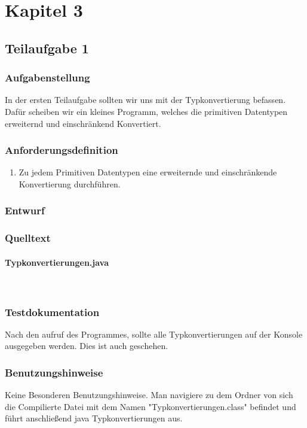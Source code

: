 \section{Kapitel 3}
\subsection{Teilaufgabe 1}
\subsubsection{Aufgabenstellung}
In der ersten Teilaufgabe sollten wir uns mit der Typkonvertierung befassen. Dafür scheiben wir
ein kleines Programm, welches die primitiven Datentypen erweiternd und einschränkend
Konvertiert.

\subsubsection{Anforderungsdefinition}
\begin{enumerate}
	\item Zu jedem Primitiven Datentypen eine erweiternde und einschränkende Konvertierung
	durchführen.
\end{enumerate}

\subsubsection{Entwurf}


\subsubsection{Quelltext}
\paragraph{Typkonvertierungen.java}\


\subsubsection{Testdokumentation}
Nach den aufruf des Programmes, sollte alle Typkonvertierungen auf der Konsole ausgegeben
werden. Dies ist auch geschehen.

\subsubsection{Benutzungshinweise}
Keine Besonderen Benutzungshinweise.
Man navigiere zu dem Ordner von sich die Compilierte Datei mit dem Namen "Typkonvertierungen.class"
\space befindet und führt anschlie\ss end java Typkonvertierungen aus.

